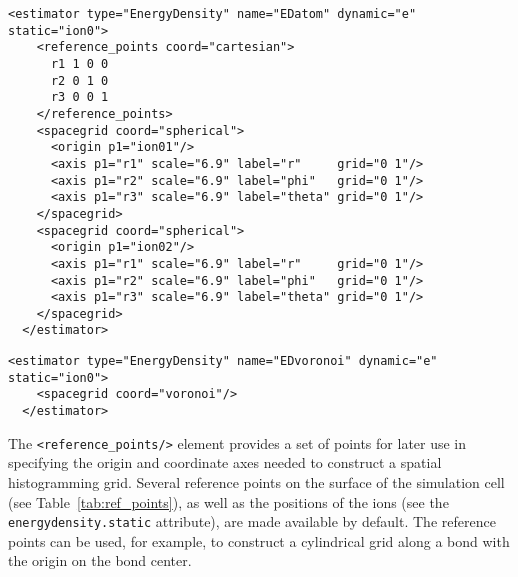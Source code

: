 \begin{lstlisting}[style=QMCPXML,caption=Energy density estimator accumulated within spheres of radius 6.9 Bohr centered on the first and second atoms in the ion0 particleset.]
  <estimator type="EnergyDensity" name="EDatom" dynamic="e" static="ion0">
    <reference_points coord="cartesian">
      r1 1 0 0 
      r2 0 1 0
      r3 0 0 1
    </reference_points>
    <spacegrid coord="spherical">
      <origin p1="ion01"/>
      <axis p1="r1" scale="6.9" label="r"     grid="0 1"/>
      <axis p1="r2" scale="6.9" label="phi"   grid="0 1"/>
      <axis p1="r3" scale="6.9" label="theta" grid="0 1"/>
    </spacegrid>
    <spacegrid coord="spherical">
      <origin p1="ion02"/>
      <axis p1="r1" scale="6.9" label="r"     grid="0 1"/>
      <axis p1="r2" scale="6.9" label="phi"   grid="0 1"/>
      <axis p1="r3" scale="6.9" label="theta" grid="0 1"/>
    </spacegrid>
  </estimator>
\end{lstlisting}


\begin{lstlisting}[style=QMCPXML,caption=Energy density estimator accumulated within Voronoi polyhedra centered on the ions.]
  <estimator type="EnergyDensity" name="EDvoronoi" dynamic="e" static="ion0">
    <spacegrid coord="voronoi"/>
  </estimator>
\end{lstlisting}



The \texttt{<reference\_points/>} element provides a set of points for later use in specifying the origin and coordinate axes needed to construct a spatial histogramming grid.  Several reference points on the surface of the simulation cell (see Table~\ref{tab:ref_points}), as well as the positions of the ions (see the \texttt{energydensity.static} attribute), are made available by default.  The reference points can be used, for example, to construct a cylindrical grid along a bond with the origin on the bond center. 

